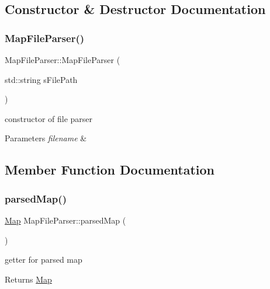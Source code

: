 \subsection{Constructor \& Destructor Documentation}
\mbox{\label{class_map_file_parser_a650246d5b95af369b885615c6b7d61bf}} 
\subsubsection{\texorpdfstring{Map\+File\+Parser()}{MapFileParser()}}
{\footnotesize\ttfamily Map\+File\+Parser\+::\+Map\+File\+Parser (\begin{DoxyParamCaption}\item[{std\+::string}]{s\+File\+Path }\end{DoxyParamCaption})\hspace{0.3cm}{\ttfamily [explicit]}}



constructor of file parser 


\begin{DoxyParams}{Parameters}
{\em filename} & \\
\hline
\end{DoxyParams}


\subsection{Member Function Documentation}
\mbox{\label{class_map_file_parser_a4c6fa40ab985db21869eecdcdba62549}} 
\subsubsection{\texorpdfstring{parsed\+Map()}{parsedMap()}}
{\footnotesize\ttfamily \mbox{\hyperlink{class_map}{Map}} Map\+File\+Parser\+::parsed\+Map (\begin{DoxyParamCaption}{ }\end{DoxyParamCaption})}



getter for parsed map 

\begin{DoxyReturn}{Returns}
\mbox{\hyperlink{class_map}{Map}} 
\end{DoxyReturn}

